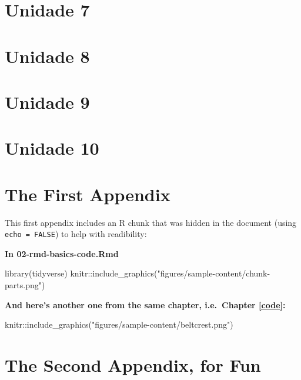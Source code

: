 \documentclass[a4paper, twoside]{templates/ociamthesis}
\newenvironment{Shaded}{\begin{snugshade}}{\end{snugshade}}
\newcommand{\FunctionTok}[1]{\textcolor[rgb]{0.00,0.00,0.00}{#1}}
\newcommand{\NormalTok}[1]{#1}
\newcommand{\SpecialCharTok}[1]{\textcolor[rgb]{0.00,0.00,0.00}{#1}}
\newcommand{\StringTok}[1]{\textcolor[rgb]{0.31,0.60,0.02}{#1}}
\renewenvironment{Shaded}
{
  \vspace{10pt}%
  \begin{snugshade}%
}{%
  \end{snugshade}%
  \vspace{8pt}%
}
\newcommand*{\bibtitle}{Bibliografía}
\begin{document}
\hypertarget{unidade-7}{%
\chapter{Unidade 7}\label{unidade-7}}

\hypertarget{unidade-8}{%
\chapter{Unidade 8}\label{unidade-8}}

\hypertarget{unidade-9}{%
\chapter{Unidade 9}\label{unidade-9}}

\hypertarget{unidade-10}{%
\chapter{Unidade 10}\label{unidade-10}}

\startappendices

\hypertarget{the-first-appendix}{%
\chapter{The First Appendix}\label{the-first-appendix}}

This first appendix includes an R chunk that was hidden in the document (using \texttt{echo\ =\ FALSE}) to help with readibility:

\textbf{In 02-rmd-basics-code.Rmd}

\begin{Shaded}
\begin{Highlighting}[]
\FunctionTok{library}\NormalTok{(tidyverse)}
\NormalTok{knitr}\SpecialCharTok{::}\FunctionTok{include\_graphics}\NormalTok{(}\StringTok{"figures/sample{-}content/chunk{-}parts.png"}\NormalTok{)}
\end{Highlighting}
\end{Shaded}

\textbf{And here's another one from the same chapter, i.e.~Chapter \ref{code}:}

\begin{Shaded}
\begin{Highlighting}[]
\NormalTok{knitr}\SpecialCharTok{::}\FunctionTok{include\_graphics}\NormalTok{(}\StringTok{"figures/sample{-}content/beltcrest.png"}\NormalTok{)}
\end{Highlighting}
\end{Shaded}

\hypertarget{the-second-appendix-for-fun}{%
\chapter{The Second Appendix, for Fun}\label{the-second-appendix-for-fun}}


\setlength{\baselineskip}{0pt} %

{\renewcommand*\MakeUppercase[1]{#1}%
\printbibliography[heading=bibintoc,title={\bibtitle}]}
\end{document}

